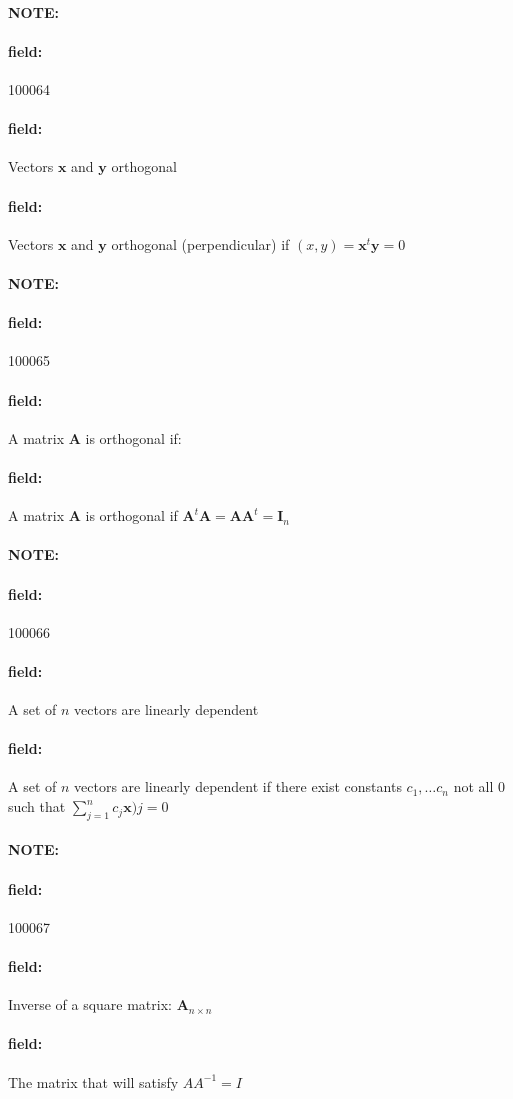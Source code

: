 \documentclass[12pt]{article}
\newenvironment{note}{\paragraph{NOTE:}}{}
\newenvironment{field}{\paragraph{field:}}{}
\begin{document}


\begin{note} \begin{field} \tiny 100064 \end{field}
  \begin{field}
    Vectors $\mathbf{x}$ and $\mathbf{y}$ orthogonal
  \end{field}
  \begin{field}
    Vectors $\mathbf{x}$ and $\mathbf{y}$ orthogonal (perpendicular) if $(x,y) = \mathbf{x}^t \mathbf{y} = 0$
  \end{field}
\end{note}

\begin{note} \begin{field} \tiny 100065 \end{field}
  \begin{field}
    A matrix $\mathbf{A}$ is orthogonal if:
  \end{field}
  \begin{field}
    A matrix $\mathbf{A}$ is orthogonal if $\mathbf{A}^t \mathbf{A} = \mathbf{A} \mathbf{A}^t = \mathbf{I}_n$
  \end{field}
\end{note}

\begin{note} \begin{field} \tiny 100066 \end{field}
  \begin{field}
    A set of $n$ vectors are linearly dependent
  \end{field}
  \begin{field}
    A set of $n$ vectors are linearly dependent if there exist constants $c_1, \ldots c_n$ not all 0 such that $\sum_{j=1}^n c_j \mathbf{x})j = 0$
  \end{field}
\end{note}

\begin{note} \begin{field} \tiny 100067 \end{field}
  \begin{field}
    Inverse of a square matrix: $\mathbf{A}_{n\times n}$
  \end{field}
  \begin{field}
    The matrix that will satisfy $AA^{-1} = I$
  \end{field}
\end{note}
\end{document}
